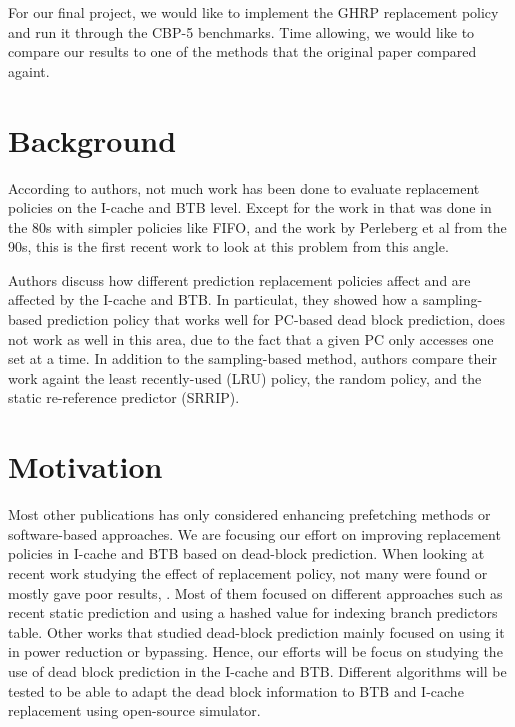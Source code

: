\documentclass[11pt]{article}
\begin{document}
For our final project, we would like to implement the GHRP replacement policy and run it through the CBP-5 benchmarks. Time allowing, we would like to compare our 
results to one of the methods that the original paper compared againt.

\section{Background}
\label{sec:background}

According to authors, not much work has been done to evaluate replacement policies on the I-cache and BTB level. Except for the work in \cite{smith-1985} that was done in the 80s
with simpler policies like FIFO, and the work by Perleberg et al \cite{perleberg-1993} from the 90s, this is the first recent work to look at this problem from this angle.

Authors discuss how different prediction replacement policies affect and are affected by the I-cache and BTB. In particulat, they showed how a sampling-based
prediction policy that works well for PC-based dead block prediction, does not work as well in this area, due to the fact that a given PC only accesses one set at a time.
In addition to the sampling-based method, authors compare their work againt the least recently-used (LRU) policy, the random policy, and the static re-reference predictor (SRRIP).

\section{Motivation}
\label{sec:motivation}

Most other publications has only considered enhancing prefetching methods or software-based approaches. We are focusing our 
effort on improving replacement policies in I-cache and BTB based on dead-block prediction. When looking at recent work studying 
the effect of replacement policy, not many were found or mostly gave poor results, . Most of them focused on different approaches 
such as recent static prediction and using a hashed value for indexing branch predictors table. Other works that studied dead-block 
prediction mainly focused on using it in power reduction or bypassing. Hence, our efforts will be focus on studying the use of dead block prediction
in the I-cache and BTB. Different algorithms will be tested to be able to adapt the dead block information to BTB and I-cache replacement using open-source simulator.  
\end{document}
